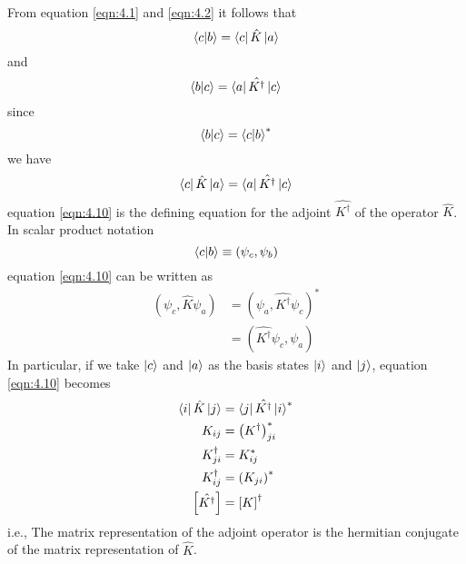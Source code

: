 From equation \ref{eqn:4.1} and \ref{eqn:4.2} it follows that
\begin{equation}\label{eqn:4.7}
\braket{c}{b} = \bra{c}\hat{K}\ket{a}
\end{equation}
and 
\begin{equation}\label{eqn:4.8}
\braket{b}{c} = \bra{a} \hat{K^\dagger} \ket{c}
\end{equation}	 
since
\begin{equation}\label{eqn:4.9}
\braket{b}{c} = \braket{c}{b}^*
\end{equation}
we have
\begin{equation}\label{eqn:4.10}
\bra{c} \hat{K} \ket{a} = \bra{a} \hat{K^\dagger} \ket{c}
\end{equation}
equation \ref{eqn:4.10} is the defining equation for the adjoint $\hat{K^\dagger}$ of the operator $\hat{K}$. In scalar product notation
\begin{equation}\label{eqn:4.11}
\braket{c}{b} \equiv \left(\psi_c, \psi_b \right)
\end{equation}
equation \ref{eqn:4.10} can be written as
\begin{align}\label{eqn:4.12-4.13}
	\left(\psi_c, \hat{K} \psi_a \right) 
	&= \left(\psi_a, \hat{K^\dagger} \psi_c\right)^*\\
	&=	\left(\hat{K^\dagger}\psi_c, \psi_a \right)
\end{align}
In particular, if we take $\ket{c}$ and $\ket{a}$ as the basis states $\ket{i}$ and $\ket{j}$, equation \ref{eqn:4.10} becomes
\begin{align}\label{eqn:4.14-4.18}
	\bra{i}\hat{K}\ket{j} &= \bra{j}\hat{K^\dagger}\ket{i}^* \\
	K_{i j} &= \left(K^\dagger\right)_{j i}^* \\
	K_{j i}^\dagger &= K_{i j}^* \\
	K_{i j}^\dagger &= \left(K_{j i} \right)^* \\
	\left[\hat{K^\dagger} \right] &= \left[K \right]^\dagger
\end{align}
i.e., The matrix representation of the adjoint operator is the hermitian conjugate of the matrix representation of $\hat{K}$.

